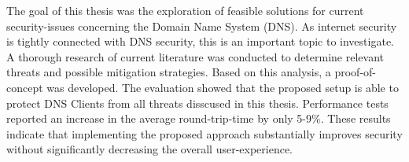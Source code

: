 

The goal of this thesis was the exploration of feasible solutions for current security-issues concerning the Domain Name System (DNS). As internet security is tightly connected with DNS security, this is an important topic to investigate. A thorough research of current literature was conducted to determine relevant threats and possible mitigation strategies. Based on this analysis, a proof-of-concept was developed. The evaluation showed that the proposed setup is able to protect DNS Clients from all threats disscused in this thesis. Performance tests reported an increase in the average round-trip-time by only 5-9\%. These results indicate that implementing the proposed approach substantially improves security without significantly decreasing the overall user-experience.